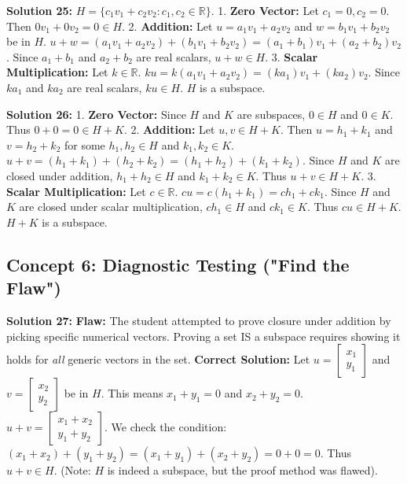 \documentclass[11pt]{article}
\begin{document}
\vspace{0.3cm}
\textbf{Solution 25:}
$H = \{ c_1 v_1 + c_2 v_2 : c_1, c_2 \in \mathbb{R} \}$.
1. \textbf{Zero Vector:} Let $c_1=0, c_2=0$. Then $0v_1 + 0v_2 = 0 \in H$.
2. \textbf{Addition:} Let $u = a_1 v_1 + a_2 v_2$ and $w = b_1 v_1 + b_2 v_2$ be in $H$.
$u+w = (a_1 v_1 + a_2 v_2) + (b_1 v_1 + b_2 v_2) = (a_1+b_1)v_1 + (a_2+b_2)v_2$. Since $a_1+b_1$ and $a_2+b_2$ are real scalars, $u+w \in H$.
3. \textbf{Scalar Multiplication:} Let $k \in \mathbb{R}$. $ku = k(a_1 v_1 + a_2 v_2) = (ka_1)v_1 + (ka_2)v_2$. Since $ka_1$ and $ka_2$ are real scalars, $ku \in H$. $H$ is a subspace.

\vspace{0.3cm}
\textbf{Solution 26:}
1. \textbf{Zero Vector:} Since $H$ and $K$ are subspaces, $0 \in H$ and $0 \in K$. Thus $0+0 = 0 \in H+K$.
2. \textbf{Addition:} Let $u, v \in H+K$. Then $u = h_1+k_1$ and $v = h_2+k_2$ for some $h_1, h_2 \in H$ and $k_1, k_2 \in K$.
$u+v = (h_1+k_1) + (h_2+k_2) = (h_1+h_2) + (k_1+k_2)$. Since $H$ and $K$ are closed under addition, $h_1+h_2 \in H$ and $k_1+k_2 \in K$. Thus $u+v \in H+K$.
3. \textbf{Scalar Multiplication:} Let $c \in \mathbb{R}$. $cu = c(h_1+k_1) = ch_1 + ck_1$. Since $H$ and $K$ are closed under scalar multiplication, $ch_1 \in H$ and $ck_1 \in K$. Thus $cu \in H+K$. $H+K$ is a subspace.

\subsection*{Concept 6: Diagnostic Testing ("Find the Flaw")}

\textbf{Solution 27:}
\textbf{Flaw:} The student attempted to prove closure under addition by picking specific numerical vectors. Proving a set IS a subspace requires showing it holds for \textit{all} generic vectors in the set.
\textbf{Correct Solution:} Let $u = \begin{bmatrix} x_1 \\ y_1 \end{bmatrix}$ and $v = \begin{bmatrix} x_2 \\ y_2 \end{bmatrix}$ be in $H$. This means $x_1+y_1=0$ and $x_2+y_2=0$.
$u+v = \begin{bmatrix} x_1+x_2 \\ y_1+y_2 \end{bmatrix}$. We check the condition: $(x_1+x_2) + (y_1+y_2) = (x_1+y_1) + (x_2+y_2) = 0 + 0 = 0$. Thus $u+v \in H$. (Note: $H$ is indeed a subspace, but the proof method was flawed).
\end{document}
